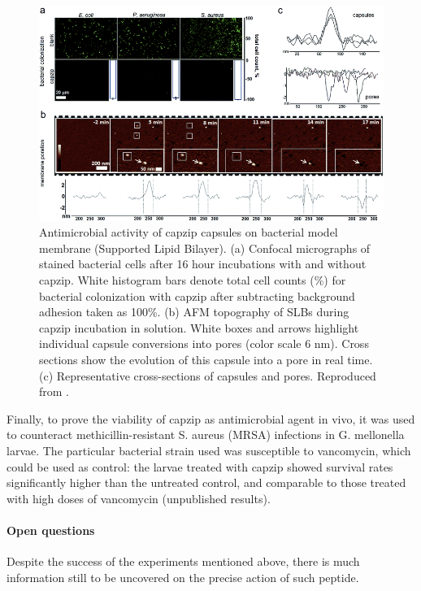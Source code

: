 \begin{figure}
\begin{center}
\includegraphics[width=0.8\linewidth, align = c]{1introduction/pics/AFM_on_SLB}
\caption[Capzip experiments on Supported Lipid Bilayers]{Antimicrobial activity of capzip capsules on bacterial model membrane (Supported Lipid Bilayer). (a) Confocal micrographs of stained bacterial cells after 16 hour incubations with and without capzip. White histogram bars denote total cell counts (\%) for bacterial colonization with capzip after subtracting background adhesion taken as 100\%. (b) AFM topography of SLBs during capzip incubation in solution. White boxes and arrows highlight individual capsule conversions into pores (color scale 6 nm). Cross sections show the evolution of this capsule into a pore in real time. (c) Representative cross-sections of capsules and pores. Reproduced from \citep{Castelletto2016}.} \label{fig:exp_SLB}
\end{center}
\end{figure}

Finally, to prove the viability of capzip as antimicrobial agent in vivo, it was used to counteract methicillin-resistant S. aureus (MRSA) infections in G. mellonella larvae. The particular bacterial strain used was susceptible to vancomycin, which could be used as control: the larvae treated with capzip showed survival rates significantly higher than the untreated control, and comparable to those treated with high doses of vancomycin (unpublished results).



\paragraph{Open questions} Despite the success of the experiments mentioned above, there is much information still to be uncovered on the precise action of such peptide. 

